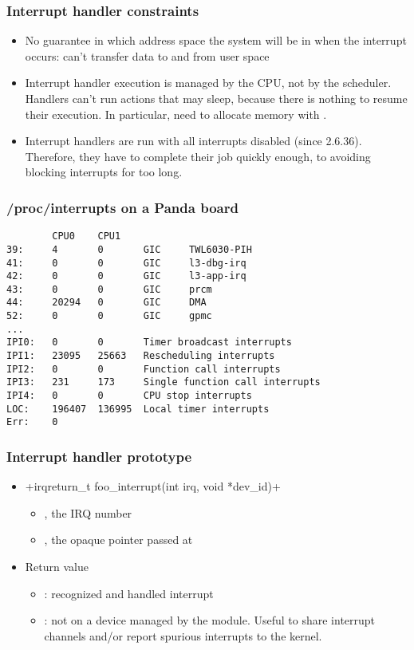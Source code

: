 \begin{frame}
  \frametitle{Interrupt handler constraints}
  \begin{itemize}
  \item No guarantee in which address space the system will be in when
    the interrupt occurs: can't transfer data to and from user space
  \item Interrupt handler execution is managed by the CPU, not by the
    scheduler.  Handlers can't run actions that may sleep, because
    there is nothing to resume their execution. In particular, need to
    allocate memory with .
  \item Interrupt handlers are run with all interrupts disabled (since
    2.6.36).  Therefore, they have to complete their job quickly
    enough, to avoiding blocking interrupts for too long.
  \end{itemize}
\end{frame}

\begin{frame}[fragile]
  \frametitle{/proc/interrupts on a Panda board}
\begin{verbatim}
        CPU0    CPU1
39:     4       0       GIC     TWL6030-PIH
41:     0       0       GIC     l3-dbg-irq
42:     0       0       GIC     l3-app-irq
43:     0       0       GIC     prcm
44:     20294   0       GIC     DMA
52:     0       0       GIC     gpmc
...
IPI0:   0       0       Timer broadcast interrupts
IPI1:   23095   25663   Rescheduling interrupts
IPI2:   0       0       Function call interrupts
IPI3:   231     173     Single function call interrupts
IPI4:   0       0       CPU stop interrupts
LOC:    196407  136995  Local timer interrupts
Err:    0
\end{verbatim}
\end{frame}

\begin{frame}[fragile]
  \frametitle{Interrupt handler prototype}
  \begin{itemize}
  \item {}+irqreturn_t foo_interrupt(int irq, void *dev_id)+
    \begin{itemize}
    \item {}, the IRQ number
    \item {}, the opaque pointer passed at
    \end{itemize}
  \item Return value
    \begin{itemize}
    \item {}: recognized and handled interrupt
    \item {}: not on a device managed by the
      module. Useful to share interrupt channels and/or report
      spurious interrupts to the kernel.
    \end{itemize}
  \end{itemize}
\end{frame}

